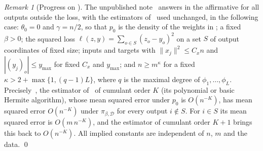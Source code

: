 \documentclass[11pt]{article}
\theoremstyle{remark}
\newtheorem{remark}{Remark}
\begin{document}
\begin{remark}[Progress on ]
The unpublished note~\cite{gibbs-transfer} answers  in the affirmative for all outputs outside the loss, with the estimators of~\cite{MSP-ARC} used unchanged, in the following case: $\theta_0 = 0$ and $\gamma = n/2$, so that $p_0$ is the density of the weights in ; a fixed $\beta > 0$; the squared loss $\ell(z, y) = \sum_{o \in S} (z_o - y_o)^2$ on a set $S$ of output coordinates of fixed size; inputs and targets with $\|x_j\|^2 \leq C_x n$ and $|(y_j)_o| \leq y_{\max}$ for fixed $C_x$ and $y_{\max}$; and $n \geq m^\kappa$ for a fixed $\kappa > 2 + \max\{1, (q-1)L\}$, where $q$ is the maximal degree of $\phi_1, \dots, \phi_L$. Precisely~\cite[Theorem~C and Corollary~C.1]{gibbs-transfer}, the estimator of~\cite{MSP-ARC} of cumulant order $K$ (its polynomial or basic Hermite algorithm), whose mean squared error under $p_0$ is $O(n^{-K})$, has mean squared error $O(n^{-K})$ under $\pi_{\beta, \mathcal{D}}$ for every output $i \notin S$. For $i \in S$ its mean squared error is $O(m\, n^{-K})$, and the estimator of cumulant order $K + 1$ brings this back to $O(n^{-K})$. All implied constants are independent of $n$, $m$ and the data. \qed
\end{remark}
\end{document}
